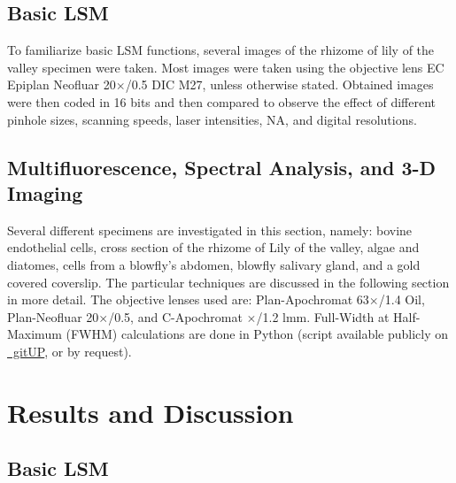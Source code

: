 \subsection{Basic LSM}
To familiarize basic LSM functions, several images of the rhizome of lily of the valley specimen were taken.  
Most images were taken using the objective lens EC Epiplan Neofluar 20$\times$/0.5 DIC M27, unless otherwise stated. Obtained images were then coded in 16 bits and then compared to observe the effect of different pinhole sizes, scanning speeds, laser intensities, NA, and digital resolutions.

\subsection{Multifluorescence, Spectral Analysis, and 3-D Imaging}
Several different specimens are investigated in this section, namely: bovine endothelial cells, cross section of the rhizome of Lily of the valley, algae and diatomes, cells from a blowfly's abdomen, blowfly salivary gland, and a gold covered coverslip. 
The particular techniques are discussed in the following section in more detail. 
The objective lenses used are: Plan-Apochromat 63$\times$/1.4 Oil, Plan-Neofluar 20$\times$/0.5, and C-Apochromat $\times$/1.2 lmm. 
Full-Width at Half-Maximum (FWHM) calculations are done in \faPython Python (script available publicly on \href{https://gitup.uni-potsdam.de/showard/lightmicroscopy}{\faGitlab~gitUP}, or by request).

\section{Results and Discussion}

\subsection{Basic LSM}

